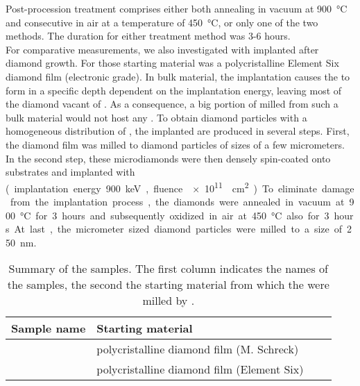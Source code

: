 	Post-procession treatment comprises either both annealing in vacuum at \SI{900}{\degreeCelsius} and consecutive \ox in air at a temperature of \SI{450}{\degreeCelsius}, or only one of the two methods.
	The duration for either treatment method was 3-6 hours.
	\\
	For comparative measurements, we also investigated \nds with \sivs implanted after diamond growth. 
	For those \nds starting material was a polycristalline Element Six diamond film (electronic grade).
	In bulk material, the implantation causes the \sivs to form in a specific depth dependent on the implantation energy, leaving most of the diamond vacant of \sivs.
	As a consequence, a big portion of  \nds milled from such a bulk material would not host any \sivs.
	To obtain diamond particles with a homogeneous distribution of \sivs, the implanted \nds are produced in several steps. 
	First, the diamond film was milled to diamond particles of sizes of a few micrometers.
	In the second step, these microdiamonds were then densely spin-coated onto \ir substrates and implanted with \si (implantation energy \SI{900}{keV}, fluence \SI{e11}{\per\centi\meter\squared}).
	To eliminate damage from the implantation process, the diamonds were annealed in vacuum at \SI{900}{\degreeCelsius} for 3 hours and subsequently oxidized in air at \SI{450}{\degreeCelsius} also for 3 hours.
	At last, the micrometer sized diamond particles were milled to a size of \SI{250}{\nano\meter}.



	\begin{table}[tp] 
		\centering 
		\caption{Summary of the \BASD samples. The first column indicates the names of the samples, the second the starting material from which the \nds were milled by \basd.} \label{tab::samplenames} 
			\begin{tabular}{llll} 
			\toprule
			Sample name & Starting material \\ 
			\midrule
			\basds & polycristalline diamond film (M. Schreck) \\ \hline 
			\basdes & polycristalline diamond film (Element Six) \\ 
			\bottomrule
			\end{tabular} 
	\end{table}



